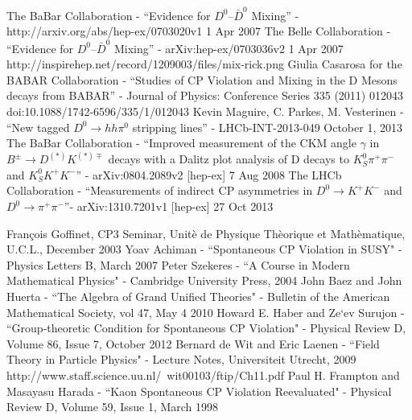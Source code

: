 \documentclass[floatfix,aps,prd,amsmath,amssymb]{revtex4}
\begin{document}
\begin{thebibliography}{10}
The BaBar Collaboration - ``Evidence for $D^{0}–\bar{D}^{0}$ Mixing'' - http://arxiv.org/abs/hep-ex/0703020v1 1 Apr 2007 
The Belle Collaboration - ``Evidence for $D^{0}–\bar{D}^{0}$ Mixing'' - arXiv:hep-ex/0703036v2 1 Apr 2007 
http://inspirehep.net/record/1209003/files/mix-rick.png
Giulia Casarosa for the BABAR Collaboration - ``Studies of CP Violation and Mixing in the D Mesons decays from BABAR'' - Journal of Physics: Conference Series 335 (2011) 012043   doi:10.1088/1742-6596/335/1/012043
Kevin Maguire, C. Parkes, M. Vesterinen - ``New tagged $D^{0} \rightarrow h h \pi^{0}$ stripping lines'' - LHCb-INT-2013-049 October 1, 2013
The BaBar Collaboration - ``Improved measurement of the CKM angle $\gamma$ in $B^{\pm} \rightarrow D^{(*)}K^{(*)\mp}$ decays with a Dalitz plot analysis of D decays to $K^{0}_S \pi^{+} \pi^{-}$ and $K^{0}_{S} K^{+} K^{−}$'' - arXiv:0804.2089v2 [hep-ex] 7 Aug 2008
The LHCb Collaboration - ``Measurements of indirect CP asymmetries in $D^{0} \rightarrow K^{+}K^{-}$ and $D^{0} \rightarrow \pi^{+} \pi^{-}$''- arXiv:1310.7201v1 [hep-ex] 27 Oct 2013


Fran\c{c}ois Goffinet, CP3 Seminar, Unit\`{e} de Physique Th\`{e}orique et Math\`{e}matique, U.C.L., December 2003
Yoav Achiman -  ``Spontaneous CP Violation in SUSY" - Physics Letters B, March 2007
Peter Szekeres - ``A Course in Modern Mathematical Physics" - Cambridge University Press, 2004
John Baez and John Huerta - ``The Algebra of Grand Unified Theories" - Bulletin of the American Mathematical Society, vol 47, May 4 2010
Howard E. Haber and Ze`ev Surujon - ``Group-theoretic Condition for Spontaneous CP Violation" - Physical Review D, Volume 86, Issue 7, October 2012
Bernard de Wit and Eric Laenen - ``Field Theory in Particle Physics" - Lecture Notes, Universiteit Utrecht, 2009 http://www.staff.science.uu.nl/~wit00103/ftip/Ch11.pdf
Paul H. Frampton and Masayasu Harada - ``Kaon Spontaneous CP Violation Reevaluated" - Physical Review D, Volume 59, Issue 1, March 1998

\end{thebibliography}
\end{document}

